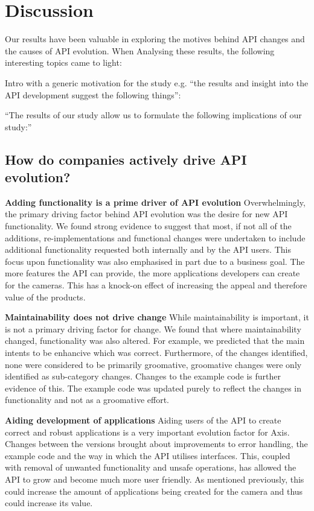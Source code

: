 \documentclass{sig-alternate}
\begin{document}
\section{Discussion}
Our results have been valuable in exploring the motives behind API changes and the causes of API evolution. When Analysing these results, the following interesting topics came to light:

Intro with a generic motivation for the study e.g. ``the results and insight into the API development suggest the following things'':


``The results of our study allow us to formulate the following implications of our study:''


\subsection{How do companies actively drive API evolution?}

\noindent
\textbf{Adding functionality is a prime driver of API evolution  }
Overwhelmingly, the primary driving factor behind API evolution was the desire for new API functionality. We found strong evidence to suggest that most, if not all of the additions, re-implementations and functional changes were undertaken to include additional functionality requested both internally and by the API users. This focus upon functionality was also emphasised in part due to a business goal. The more features the API can provide, the more applications developers can create for the cameras. This has a knock-on effect of increasing the appeal and therefore value of the products.

\smallskip \noindent
\textbf{Maintainability does not drive change  } 
While maintainability is important, it is not a primary driving factor for change. We found that where maintainability changed, functionality was also altered. For example, we predicted that the main intents to be enhancive which was correct. Furthermore, of the changes identified, none were considered to be primarily groomative, groomative changes were only identified as sub-category changes. Changes to the example code is further evidence of this. The example code was updated purely to reflect the changes in functionality and not as a groomative effort. 

\smallskip \noindent
\textbf{Aiding development of applications  } 
Aiding users of the API to create correct and robust applications is a very important evolution factor for Axis. Changes between the versions brought about improvements to error handling, the example code and the way in which the API utilises interfaces. This, coupled with removal of unwanted functionality and unsafe operations, has allowed the API to grow and become much more user friendly. As mentioned previously, this could increase the amount of applications being created for the camera and thus could increase its value.
\end{document}
